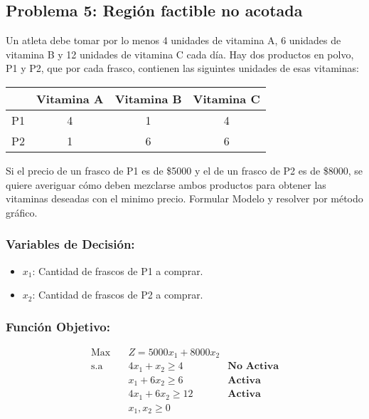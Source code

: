 \documentclass{templateNote}
\begin{document}
\subsection*{Problema 5: Región factible no acotada}
Un atleta debe tomar por lo menos 4 unidades de vitamina A, 6 unidades de vitamina B y 12 unidades de vitamina C cada día. Hay dos productos en polvo, P1 y P2, que por cada frasco, contienen las siguintes unidades de esas vitaminas:
\begin{center}
    \begin{tabular}{|c|c|c|c|}
        \hline
        & Vitamina A & Vitamina B & Vitamina C \\ \hline
        P1 & 4 & 1 & 4 \\ \hline
        P2 & 1 & 6 & 6 \\ \hline
    \end{tabular}
\end{center}

Si el precio de un frasco de P1 es de \$5000 y el de un frasco de P2 es de \$8000, se quiere averiguar cómo deben mezclarse ambos productos para obtener las vitaminas deseadas con el minimo precio. Formular Modelo y resolver por método gráfico.

\subsubsection*{Variables de Decisión:}
\begin{itemize}
    \item $x_1$: Cantidad de frascos de P1 a comprar.
    \item $x_2$: Cantidad de frascos de P2 a comprar.
\end{itemize}
\subsubsection*{Función Objetivo:}
\begin{equation*}
    \begin{aligned}
        \text{Max} \quad & Z = 5000x_1 + 8000x_2 \\
        \text{s.a} \quad & 4x_1 + x_2 \geq 4 \quad &\textbf{No Activa} \\
        & x_1 + 6x_2 \geq 6 \quad &\textbf{Activa} \\
        & 4x_1 + 6x_2 \geq 12 \quad &\textbf{Activa} \\
        & x_1, x_2 \geq 0
    \end{aligned}
\end{equation*}
\end{document}
